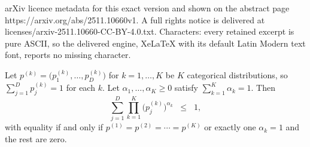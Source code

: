 \documentclass[10pt,a4paper]{amsart}
\begin{document}
arXiv licence metadata for this exact version and shown on the abstract page https://arxiv.org/abs/2511.10660v1. A full rights notice is delivered at licenses/arxiv-2511.10660-CC-BY-4.0.txt. Characters: every retained excerpt is pure ASCII, so the delivered engine, XeLaTeX with its default Latin Modern text font, reports no missing character.
\begin{lemma}
    \label{lemma:proof_inequality}
    Let $p^{(k)} = \bigl(p^{(k)}_1, \ldots, p^{(k)}_D\bigr)$ for $k=1,\dots,K$ 
    be $K$ categorical distributions, so $\sum_{j=1}^D p^{(k)}_j = 1$ for each $k$. 
    Let $\alpha_1,\dots,\alpha_K \ge 0$ satisfy $\sum_{k=1}^K \alpha_k = 1.$ 
    Then
    \[
    \sum_{j=1}^D 
    \prod_{k=1}^K \bigl(p^{(k)}_j\bigr)^{\alpha_k}
    \;\;\le\;\; 1,
    \]
    with equality if and only if $p^{(1)} = p^{(2)} = \cdots = p^{(K)}$ 
    or exactly one $\alpha_k=1$ and the rest are zero.
\end{lemma}
\end{document}
